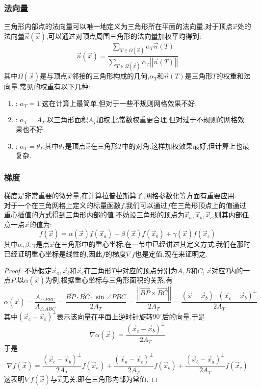 \documentclass{ctexart}
\begin{document}
\subsubsection{法向量}
三角形内部点的法向量可以唯一地定义为三角形所在平面的法向量.对于顶点$\vec{x}$处的法向量$\vec{n}(\vec{x})$,可以通过对顶点周围三角形的法向量加权平均得到:
\[\vec{n}(\vec{x})=\dfrac{\displaystyle\sum_{T\in\Omega(\vec{x})}\alpha_T\vec{n}(T)}{\displaystyle\sum_{T\in\Omega(\vec{x})}\alpha_T\left|\left|\vec{n}(T)\right|\right|}\]
其中$\Omega(\vec{x})$是与顶点$\vec{x}$邻接的三角形构成的几何,$\alpha_T$和$\vec{n}(T)$是三角形$T$的权重和法向量.常见的权重有以下几种:
\begin{enumerate}[label=\tbf{\arabic*.},topsep=0pt,parsep=0pt,itemsep=0pt,partopsep=0pt]
    \item {}: $\alpha_T=1$.这在计算上最简单,但对于一些不规则网格效果不好.
    \item {}: $\alpha_T=A_T$.以三角形面积$A_T$加权,比常数权重更合理,但对过于不规则的网格效果也不好.
    \item {}: $\alpha_T=\theta_T$,其中$\theta_T$是顶点$\vec{x}$在三角形$T$中的对角.这样加权效果最好,但计算上也最复杂.
\end{enumerate}
\subsubsection{梯度}
梯度是非常重要的微分量,在计算拉普拉斯算子,网格参数化等方面有重要应用.\\
\indent 对于一个在三角网格上定义的标量函数$f$,我们可以通过$f$在三角形顶点上的值通过重心插值的方式得到三角形内部的值.不妨设三角形的顶点为$\vec{x}_a,\vec{x}_b,\vec{x}_c$,则其内部任意一点$\vec{x}$的值为:
\[f(\vec{x})=\alpha(\vec{x})f(\vec{x}_a)+\beta(\vec{x})f(\vec{x}_b)+\gamma(\vec{x})f(\vec{x}_c)\]
其中$\alpha,\beta,\gamma$是点$\vec{x}$在三角形中的重心坐标,在一节中已经讲过其定义方式.我们在那时已经证明重心坐标是线性的,因此$f$的梯度$\nabla f$也是定值.现在来证明之.
\begin{proof}
    不妨假定$\vec{x}_a,\vec{x}_b$和$\vec{x}_c$在三角形$T$中对应的顶点分别为$A,B$和$C$, $\vec{x}$对应$T$内的一点$P$.以$\alpha(\vec{x})$为例,根据重心坐标与三角形面积的关系,有
    \[\alpha(\vec{x})=\dfrac{A_{\triangle PBC}}{A_{\triangle ABC}}=\dfrac{\overline{BP}\cdot\overline{BC}\cdot\sin\angle PBC}{2A_T}=\dfrac{\left|\left|\overrightarrow{BP}\times\overrightarrow{BC}\right|\right|}{2A_T}=\dfrac{\left(\vec{x}-\vec{x}_b\right)\cdot\left(\vec{x}_c-\vec{x}_b\right)^{\bot}}{2A_T}\]
    其中$\left(\vec{x}_c-\vec{x}_b\right)^\bot$表示该向量在平面上逆时针旋转$90^\circ$后的向量.于是
    \[\nabla\alpha(\vec{x})=\dfrac{\left(\vec{x}_c-\vec{x}_b\right)^\bot}{2A_T}\]
    于是
    \[\nabla f(\vec{x})=\dfrac{\left(\vec{x}_c-\vec{x}_b\right)^\bot}{2A_T}f\left(\vec{x}_a\right)+\dfrac{\left(\vec{x}_a-\vec{x}_c\right)^\bot}{2A_T}f\left(\vec{x}_b\right)+\dfrac{\left(\vec{x}_b-\vec{x}_a\right)^\bot}{2A_T}f\left(\vec{x}_c\right)\]
    这表明$\nabla f(\vec{x})$与$\vec{x}$无关,即在三角形内部为常值.
\end{proof}
\end{document}
